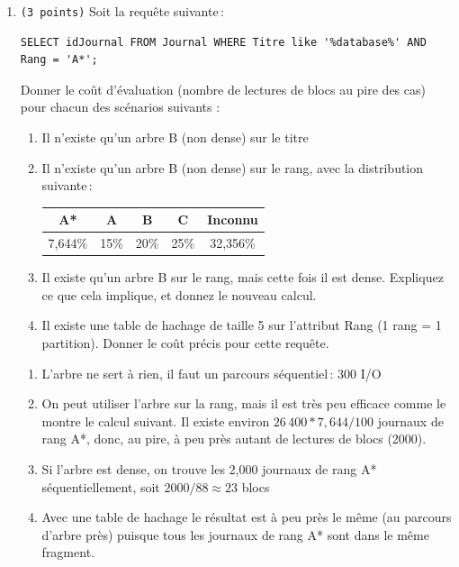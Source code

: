 \begin{enumerate}
	\item {\tt (3~points)} Soit la requête suivante\,:
\begin{verbatim}
SELECT idJournal FROM Journal WHERE Titre like '%database%' AND Rang = 'A*';
\end{verbatim}
	Donner le coût d'évaluation (nombre de lectures de blocs au pire des cas)
   pour chacun des scénarios  suivants :
	\begin{enumerate}
		\item Il n'existe qu'un arbre  B (non dense) sur le titre
		\item  Il n'existe qu'un arbre  B (non dense) sur le rang, avec la distribution suivante\,:\\
		\begin{tabular}{|c|c|c|c|c|}
			\hline
			A*& A& B& C& Inconnu\\
			\hline
			7,644\%& 15\% & 20\% & 25\% & 32,356\%\\
			\hline
		\end{tabular}
    \item Il existe qu'un arbre  B sur le rang, mais cette fois il est dense.
     Expliquez ce que cela implique, et donnez le nouveau calcul.
		\item Il existe une table de hachage de taille 5 sur
    l'attribut Rang (1 rang = 1 partition). Donner le coût précis pour cette requête.
	\end{enumerate}
	\begin{solution}
		\begin{enumerate}
			\item L'arbre  ne sert à rien, il faut un parcours séquentiel\,: 300 I/O
			\item On peut utiliser l'arbre  sur la rang, mais il est très peu
      efficace comme le montre le calcul suivant.
      Il existe environ $26\, 400*7,644/100$ journaux de rang A*,
      donc, au pire, à peu près autant de lectures de blocs (2000).

      \item Si l'arbre est dense, on trouve les 2,000 journaux de rang A*
         séquentiellement, soit $2000 / 88 \approx 23$ blocs
			\item Avec une table de hachage le résultat est à peu
         près le même (au parcours d'arbre près)
         puisque tous les journaux de rang A* sont dans le même fragment.
		\end{enumerate}
	\end{solution}


\end{enumerate}
